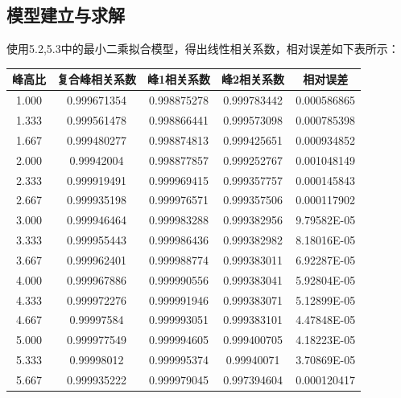 \documentclass{article}
\numberwithin{equation}{subsection}
\begin{document}
\subsection{模型建立与求解}
使用5.2,5.3中的最小二乘拟合模型，得出线性相关系数，相对误差如下表所示：
\begin{table}[h]
    \centering
    \begin{tabular}{|c|c|c|c|c|}\hline
        峰高比&复合峰相关系数&峰1相关系数&峰2相关系数&相对误差\\\hline
        1.000&0.999671354&	0.998875278&	0.999783442&0.000586865\\

        1.333&0.999561478&	0.998866441&	0.999573098&0.000785398\\

        1.667&0.999480277&	0.998874813&	0.999425651&0.000934852\\

        2.000&0.99942004&	0.998877857&	0.999252767&0.001048149\\

        2.333&0.999919491&	0.999969415&	0.999357757&0.000145843\\

        2.667&0.999935198&	0.999976571&	0.999357506&0.000117902\\

        3.000&0.999946464&	0.999983288&	0.999382956&9.79582E-05\\

        3.333&0.999955443&	0.999986436&	0.999382982&8.18016E-05\\

        3.667&0.999962401&	0.999988774&	0.999383011&6.92287E-05\\

        4.000&0.999967886&	0.999990556&	0.999383041&5.92804E-05\\

        4.333&0.999972276&	0.999991946&	0.999383071&5.12899E-05\\

        4.667&0.99997584&	0.999993051&	0.999383101&4.47848E-05\\

        5.000&0.999977549&	0.999994605&	0.999400705&4.18223E-05\\

        5.333&0.99998012&	0.999995374&	0.99940071&3.70869E-05\\

        5.667&0.999935222&	0.999979045&	0.997394604&0.000120417\\


\end{tabular}
\end{table}
\end{document}

